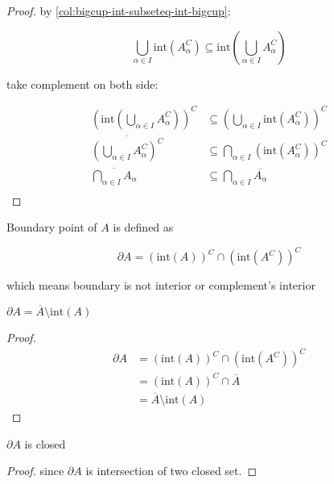 \begin{proof}
    by \autoref{col:bigcup-int-subseteq-int-bigcup}:

    \[
        \bigcup_{\alpha \in I}\mathrm{int}(A_{\alpha}^C) \subseteq \mathrm{int}(\bigcup_{\alpha \in I}A_{\alpha}^C)
    \]

    take complement on both side:

    \begin{align*}
      (\mathrm{int}(\bigcup_{\alpha \in I}A_{\alpha}^C))^C & \subseteq  (\bigcup_{\alpha \in I}\mathrm{int}(A_{\alpha}^C))^C \\
      \overline{(\bigcup_{\alpha \in I}A_{\alpha}^C)^C} & \subseteq  \bigcap_{\alpha \in I}(\mathrm{int}(A_{\alpha}^C))^C \\
      \overline{\bigcap_{\alpha \in I}A_{\alpha}} & \subseteq  \bigcap_{\alpha \in I}\overline{A_{\alpha}} \\
    \end{align*}
\end{proof}

\begin{definition}
    Boundary point of $A$ is defined as 
    
    \[
    \partial A = \left(\mathrm{int}(A) \right)^C \cap \left(\mathrm{int}(A^C) \right)^C
    \]

    which means boundary is not interior or complement's interior 
\end{definition}

\begin{lem}
    $\partial A = \overline{A} \setminus \mathrm{int}(A)$
\end{lem}

\begin{proof}
   \begin{align*}
    \partial A &= \left(\mathrm{int}(A) \right)^C \cap \left(\mathrm{int}(A^C) \right)^C \\
    &= \left(\mathrm{int}(A) \right)^C \cap \overline{A} \\
    &= \overline{A} \setminus \mathrm{int}(A)
   \end{align*} 
\end{proof}

\begin{lem}
    $\partial A$ is closed
\end{lem}

\begin{proof}
    since $\partial A$ is intersection of two closed set.
\end{proof}

